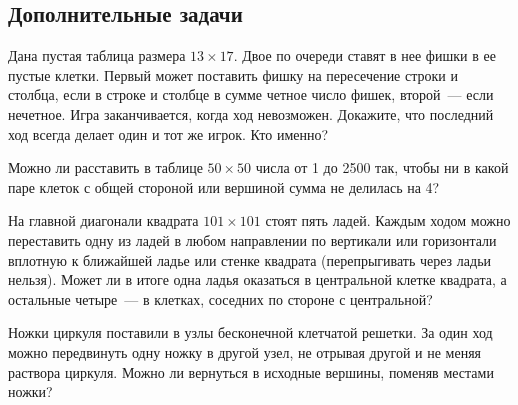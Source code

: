 

\subsection*{Дополнительные задачи}



\begin{problems}

\item
Дана пустая таблица размера $13 \times 17$.
Двое по очереди ставят в нее фишки в ее пустые клетки.
Первый может поставить фишку на пересечение строки и столбца, если в строке
и столбце в сумме четное число фишек, второй~— если нечетное.
Игра заканчивается, когда ход невозможен.
Докажите, что последний ход всегда делает один и тот же игрок.
Кто именно?

\item
Можно ли расставить в таблице $50 \times 50$ числа от 1 до 2500 так, чтобы
ни в какой паре клеток с общей стороной или вершиной сумма не делилась на 4?

\item
На главной диагонали квадрата $101 \times 101$ стоят пять ладей.
Каждым ходом можно переставить одну из ладей в любом направлении по вертикали
или горизонтали вплотную к ближайшей ладье или стенке квадрата
(перепрыгивать через ладьи нельзя).
Может ли в итоге одна ладья оказаться в центральной клетке квадрата,
а остальные четыре~— в клетках, соседних по стороне с центральной?

\item
Ножки циркуля поставили в узлы бесконечной клетчатой решетки.
За один ход можно передвинуть одну ножку в другой узел, не отрывая другой
и не меняя раствора циркуля.
Можно ли вернуться в исходные вершины, поменяв местами ножки?

\end{problems}

